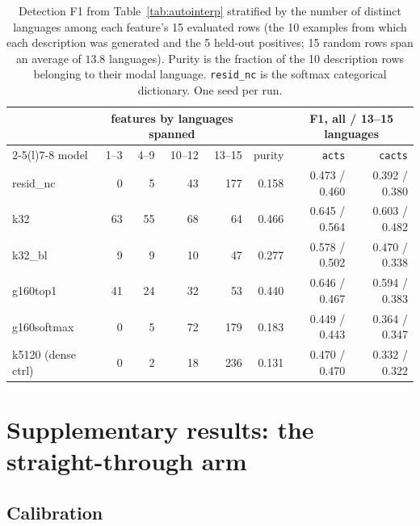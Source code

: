 \begin{table}[htbp]\centering\small\setlength{\tabcolsep}{4pt}
\begin{tabular}{@{}lrrrrrrr@{}}
\toprule
& \multicolumn{4}{c}{features by languages spanned} & & \multicolumn{2}{c}{F1, all / 13--15 languages} \\
\cmidrule(lr){2-5}\cmidrule(l){7-8}
model & 1--3 & 4--9 & 10--12 & 13--15 & purity & \texttt{acts} & \texttt{cacts} \\
\midrule
resid\_nc          & 0  & 5  & 43 & 177 & 0.158 & 0.473 / 0.460 & 0.392 / 0.380 \\
k32                & 63 & 55 & 68 & 64  & 0.466 & 0.645 / 0.564 & 0.603 / 0.482 \\
k32\_bl            & 9  & 9  & 10 & 47  & 0.277 & 0.578 / 0.502 & 0.470 / 0.338 \\
g160top1           & 41 & 24 & 32 & 53  & 0.440 & 0.646 / 0.467 & 0.594 / 0.383 \\
g160softmax        & 0  & 5  & 72 & 179 & 0.183 & 0.449 / 0.443 & 0.364 / 0.347 \\
k5120 (dense ctrl) & 0  & 2  & 18 & 236 & 0.131 & 0.470 / 0.470 & 0.332 / 0.322 \\
\bottomrule
\end{tabular}
\caption{Detection F1 from Table~\ref{tab:autointerp} stratified by the
number of distinct languages among each feature's 15 evaluated rows (the
10 examples from which each description was generated and the 5 held-out
positives; 15 random rows span an average of $13.8$ languages). Purity is
the fraction of the 10 description rows belonging to their modal language.
\texttt{resid\_nc} is the softmax categorical dictionary. One seed per run.}
\label{tab:autointerp-lang}
\end{table}

\section{Supplementary results: the straight-through arm}
\label{app:ste}

\subsection{Calibration}
\label{sec:calib}

